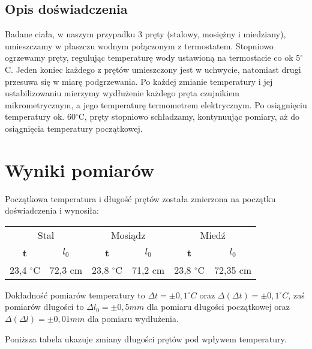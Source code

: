 \documentclass[10pt,a4paper]{article}
\newcommand{\forceindent}{\leavevmode{\parindent=3em\indent}}
\begin{document}
\subsection*{Opis doświadczenia}

\forceindent Badane ciała, w naszym przypadku 3 pręty (stalowy, mosiężny i miedziany), umieszczamy w płaszczu wodnym połączonym z termostatem. Stopniowo ogrzewamy pręty, regulując temperaturę wody ustawioną na termostacie co ok 5$^{\circ}$C. Jeden koniec każdego z prętów umieszczony jest w uchwycie, natomiast drugi przesuwa się w miarę podgrzewania. Po każdej zmianie temperatury i jej ustabilizowaniu mierzymy wydłużenie każdego pręta czujnikiem mikrometrycznym, a jego temperaturę termometrem elektrycznym. Po osiągnięciu temperatury ok. 60$^{\circ}$C, pręty stopniowo schładzamy, kontynuując pomiary, aż do osiągnięcia temperatury początkowej.
\newpage
\section{Wyniki pomiarów}
\forceindent Początkowa temperatura i długość prętów została zmierzona na początku doświadczenia i wynosiła:
\begin{center}
\begin{tabular}{|c|c||c|c||c|c|}
\multicolumn{2}{c}{Stal} & \multicolumn{2}{c}{Mosiądz} & \multicolumn{2}{c}{Miedź}\\
\hhline{|=|==|==|=|}
\textbf{t} & \textbf{$l_{0}$} & \textbf{t} & \textbf{$l_{0}$} & \textbf{t} & \textbf{$l_{0}$}\\
\hline
23,4 $^{\circ}$C & 72,3 cm & 23,8 $^{\circ}$C & 71,2 cm & 23,8 $^{\circ}$C & 72,35 cm\\
\hline
\end{tabular}
\end{center}
\vspace{10pt}



\forceindent Dokładność pomiarów temperatury to $\Delta t = \pm 0,1 ^{\circ}C$ oraz $\Delta(\Delta t) = \pm 0,1 ^{\circ}C$, zaś pomiarów długości to $\Delta l_{0} = \pm 0,5 mm$ dla pomiaru długości początkowej oraz $\Delta(\Delta l) = \pm 0,01 mm$ dla pomiaru wydłużenia.

\forceindent Poniższa tabela ukazuje zmiany długości prętów pod wpływem temperatury.\\
\end{document}

